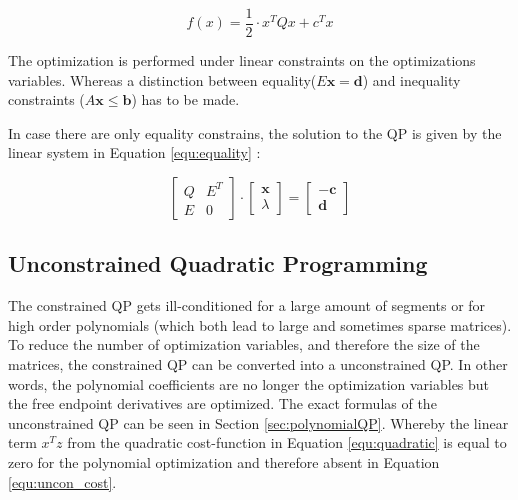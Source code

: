 \begin{equation}
 f(x)  = \frac{1}{2} \cdot x^T Q x + c^T x 
\label{equ:quadratic}
\end{equation}

The optimization is performed under linear constraints on the optimizations variables. Whereas a distinction between equality($ E\mathbf{x} = \mathbf d $) and inequality constraints ($ A\mathbf{x} \leq \mathbf b $) has to be made. 

In case there are only equality constrains, the solution to the QP is given by the linear system in Equation \ref{equ:equality} :


\begin{equation}
\begin{bmatrix}
   Q & E^T \\
   E & 0
\end{bmatrix} 
\cdot
\begin{bmatrix}
   \mathbf x \\
   \lambda
\end{bmatrix}
= 
\begin{bmatrix}
   -\mathbf c \\
   \mathbf d
\end{bmatrix}
\label{equ:equality}
\end{equation}



\subsection{Unconstrained Quadratic Programming}
The constrained QP gets ill-conditioned for a large amount of segments or for high order polynomials (which both lead to large and sometimes sparse matrices). 
To reduce the number of optimization variables, and therefore the size of the matrices, the constrained QP can be converted into a unconstrained QP. \newline
In other words, the polynomial coefficients are no longer the optimization variables but the free endpoint derivatives are optimized. The exact formulas of the unconstrained QP can be seen in Section \ref{sec:polynomialQP}. Whereby the linear term $x^T z$ from the quadratic cost-function in Equation \ref{equ:quadratic} is equal to zero for the polynomial optimization and therefore absent in Equation \ref{equ:uncon_cost}.  \newline









